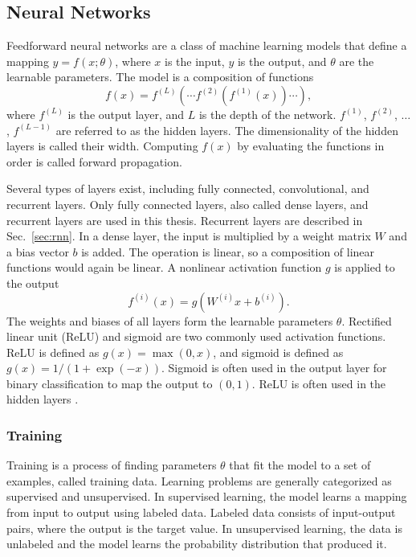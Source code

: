 \subsection{Neural Networks}\label{sec:nn}
Feedforward neural networks are a class of machine learning models that define a mapping $y=f(x;\theta)$, where $x$ is the input, $y$ is the output, and $\theta$ are the learnable parameters. The model is a composition of functions 
\begin{equation}
f(x) = f^{(L)}\!\left(\cdots f^{(2)}\!\left(f^{(1)}(x)\right)\cdots\right),
\label{eq:nn-composition}
\end{equation}
where $f^{(L)}$ is the output layer, and $L$ is the depth of the network. $f^{(1)}$, $f^{(2)}$, $\dots$, $f^{(L-1)}$ are referred to as the hidden layers. The dimensionality of the hidden layers is called their width. Computing $f(x)$ by evaluating the functions in order is called forward propagation.

Several types of layers exist, including fully connected, convolutional, and recurrent layers. Only fully connected layers, also called dense layers, and recurrent layers are used in this thesis. Recurrent layers are described in Sec.~\ref{sec:rnn}. In a dense layer, the input is multiplied by a weight matrix $W$ and a bias vector $b$ is added. The operation is linear, so a composition of linear functions would again be linear. A nonlinear activation function $g$ is applied to the output
\begin{equation}
f^{(i)}(x) = g\!\left(W^{(i)} x + b^{(i)}\right).
\end{equation}
The weights and biases of all layers form the learnable parameters $\theta$. Rectified linear unit (ReLU) and sigmoid are two commonly used activation functions. ReLU is defined as $g(x) = \max(0,x)$, and sigmoid is defined as $g(x) = 1/(1+\exp(-x))$. Sigmoid is often used in the output layer for binary classification to map the output to $(0,1)$. ReLU is often used in the hidden layers \parencite[ch.~6]{goodfellowDeepLearning2016}.

\subsubsection{Training}\label{sec:nn-training}

Training is a process of finding parameters $\theta$ that fit the model to a set of examples, called training data. Learning problems are generally categorized as supervised and unsupervised.
In supervised learning, the model learns a mapping from input to output using labeled data. Labeled data consists of input-output pairs, where the output is the target value. In unsupervised learning, the data is unlabeled and the model learns the probability distribution that produced it.

